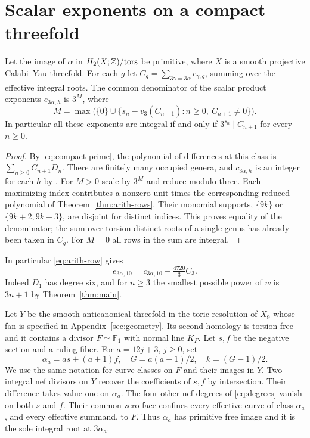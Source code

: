 \section{Scalar exponents on a compact threefold}\label{sec:compact}

\begin{corollary}\label{cor:arith-roots}
Let the image of $\alpha$ in $H_2(X;\mathbb Z)/\mathrm{tors}$ be primitive,
where $X$ is a smooth projective Calabi--Yau threefold. For each $g$
let $C_g=\sum_{3\gamma=3\alpha}c_{\gamma,g}$, summing over the
effective integral roots. The common denominator of the scalar product
exponents $e_{3\alpha,h}$ is $3^M$, where
\[
 M=\max\bigl(\{0\}\cup
       \{s_n-v_3(C_{n+1}): n\ge0,\ C_{n+1}\ne0\}\bigr).
\]
In particular all these exponents are integral if and only if
$3^{s_n}\mid C_{n+1}$ for every $n\ge0$.
\end{corollary}
\begin{proof}
By \eqref{eq:compact-prime}, the polynomial of differences at this
class is $\sum_{n\ge0}C_{n+1}D_n$. There are finitely many occupied
genera, and $c_{3\alpha,h}$ is an integer for each $h$ by
\cite[Theorem~1.1]{WueProduct}. For $M>0$ scale by $3^M$ and reduce
modulo three. Each maximizing index contributes a nonzero unit times
the corresponding reduced polynomial of Theorem~\ref{thm:arith-rows}.
Their monomial supports, $\{9k\}$ or $\{9k+2,9k+3\}$, are disjoint
for distinct indices. This proves equality of the denominator; the
sum over torsion-distinct roots of a single genus has already been
taken in $C_g$. For $M=0$ all rows in the sum are integral.
\end{proof}

In particular \eqref{eq:arith-row} gives
\begin{equation}\label{eq:arith-ten}
 e_{3\alpha,10}=c_{3\alpha,10}-\tfrac{4720}{3}C_3.
\end{equation}
Indeed $D_1$ has degree six, and for $n\ge3$ the smallest possible
power of $w$ is $3n+1$ by Theorem~\ref{thm:main}.

Let $Y$ be the smooth anticanonical threefold in the toric resolution
of $X_9$ whose fan is specified in Appendix~\ref{sec:geometry}. Its second homology is
torsion-free and it contains a divisor $F\simeq\mathbb F_1$ with
normal line $K_F$. Let $s,f$ be the negative section and a ruling fiber.
For $a=12j+3$, $j\ge0$, set
\[
 \alpha_a=as+(a+1)f,\quad G=a(a-1)/2,\quad k=(G-1)/2.
\]
We use the same notation for curve classes on $F$ and their images in
$Y$. Two integral nef divisors on $Y$ recover the coefficients of
$s,f$ by intersection. Their difference takes value one on $\alpha_a$.
The four other nef degrees of \eqref{eq:degrees} vanish on both
$s$ and $f$. Their common zero face confines every effective curve of
class $\alpha_a$, and every effective summand, to $F$. Thus $\alpha_a$
has primitive free image and it is the sole integral root at
$3\alpha_a$.

